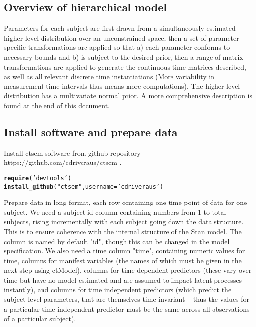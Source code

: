\documentclass[nojss]{jss}\usepackage[]{graphicx}\usepackage[]{color}
\makeatletter
\newcommand{\hlstr}[1]{\textcolor[rgb]{0.192,0.494,0.8}{#1}}%
\newcommand{\hlstd}[1]{\textcolor[rgb]{0.345,0.345,0.345}{#1}}%
\newcommand{\hlkwc}[1]{\textcolor[rgb]{0.333,0.667,0.333}{#1}}%
\newcommand{\hlkwd}[1]{\textcolor[rgb]{0.737,0.353,0.396}{\textbf{#1}}}%
\newenvironment{kframe}{%
 \def\at@end@of@kframe{}%
 \ifinner\ifhmode%
  \def\at@end@of@kframe{\end{minipage}}%
  \begin{minipage}{\columnwidth}%
 \fi\fi%
 \def\FrameCommand##1{\hskip\@totalleftmargin \hskip-\fboxsep
 \colorbox{shadecolor}{##1}\hskip-\fboxsep
     \hskip-\linewidth \hskip-\@totalleftmargin \hskip\columnwidth}%
 \MakeFramed {\advance\hsize-\width
   \@totalleftmargin\z@ \linewidth\hsize
   \@setminipage}}%
 {\par\unskip\endMakeFramed%
 \at@end@of@kframe}
\newenvironment{knitrout}{}{} %
\makeatother
\begin{document}
\subsection{Overview of hierarchical model}
Parameters for each subject are first drawn from a simultaneously estimated higher level distribution over an unconstrained space, then a set of parameter specific transformations are applied so that a) each parameter conforms to necessary bounds and b) is subject to the desired prior, then a range of matrix transformations are applied to generate the continuous time matrices described, as well as all relevant discrete time instantiations (More variability in measurement time intervals thus means more computations). The higher level distribution has a multivariate normal prior. A more comprehensive description is found at the end of this document. 

\subsection{Install software and prepare data}
Install ctsem software from github repository https://github.com/cdriveraus/ctsem .

\begin{knitrout}\small
{}\color{fgcolor}\begin{kframe}
\begin{alltt}
\hlkwd{require}\hlstd{(}\hlstr{'devtools'}\hlstd{)}
\hlkwd{install_github}\hlstd{(}\hlstr{"ctsem"}\hlstd{,}\hlkwc{username}\hlstd{=}\hlstr{'cdriveraus'}\hlstd{)}
\end{alltt}
\end{kframe}
\end{knitrout}

Prepare data in long format, each row containing one time point of data for one subject. We need a subject id column containing numbers from 1 to total subjects, rising incrementally with each subject going down the data structure. This is to ensure coherence with the internal structure of the Stan model. The column is named by default "id", though this can be changed in the model specification. We also need a time column "time", containing numeric values for time, columns for manifest variables (the names of which must be given in the next step using ctModel), columns for time dependent predictors (these vary over time but have no model estimated and are assumed to impact latent processes instantly), and columns for time independent predictors (which predict the subject level parameters, that are themselves time invariant -- thus the values for a particular time independent predictor must be the same across all observations of a particular subject).
\end{document}
